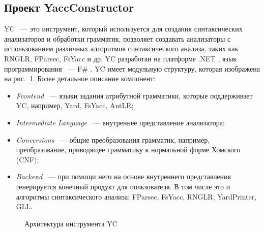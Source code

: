 \documentclass[14pt]{matmex-diploma}
\begin{document}
\subsection{Проект YaccConstructor}
YC \cite{synt_analysis} ~--- это инструмент, который используется для создания синтаксических анализаторов и обработки грамматик, позволяет создавать анализаторы с использованием различных алгоритмов синтаксического анализа, таких как RNGLR, FParsec, FsYacc и др. YC разработан на платформе .NET \cite{link:dotNet}, язык программирования ~--- F\# \cite{link:fSharp}. YC имеет модульную структуру, которая изображена на рис.~\ref{YC}.
Более детальное описание компонент:
\begin{itemize}
\item
\textit{Frontend} ~--- языки задания атрибутной грамматики, которые поддерживает YC, например, Yard, FsYacc, AntLR;
\item
\textit{Intermediate Language} ~--- внутреннее представление анализатора;
\item
\textit{Conversions} ~--- общие преобразования грамматик, например, преобразование, приводящее грамматику к нормальной форме Хомского (CNF); 
\item
\textit{Backend} ~--- при помощи него на основе внутреннего представления генерируется конечный продукт для пользователя. В том числе это и алгоритмы синтаксического анализа: FParsec, FsYacc, RNGLR, YardPrinter, GLL.
\end{itemize}

\begin{figure}[h]
  \caption{Архитектура инструмента YC}
  \label{YC}
\end{figure}
\end{document}
